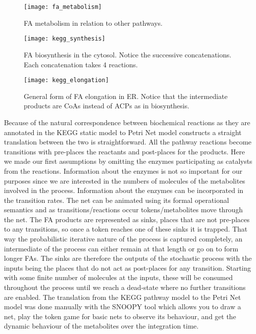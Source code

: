 \begin{figure}[htbp!]
\centering
\texttt{[image: fa\_metabolism]}
\caption[FA metabolism]{FA metabolism in relation to other pathways.}
\label{fig:fa_synthesis}
\end{figure}

\begin{figure}[htbp!]
\centering
\texttt{[image: kegg\_synthesis]}
\caption[Fatty Acid biosynthsis in cytosol]{FA biosynthesis in the
  cytosol. Notice the successive concatenations. Each concatenation
  takes 4 reactions.}
\label{fig:kegg_synthesis}
\end{figure}

\begin{figure}[htbp!]
\centering
\texttt{[image: kegg\_elongation]}
\caption[Fatty Acid elongation in ER]{General form of FA elongation in
ER. Notice that the intermediate products are CoAs instead of ACPs as
in biosynthesis.}
\label{fig:kegg_elongation}
\end{figure}

Because of the natural correspondence between biochemical reactions as
they are annotated in the KEGG static model to Petri Net model constructs
a straight translation between the two is straightforward. All the
pathway reactions become transitions with pre-places the reactants and
post-places for the products. Here we made our first assumptions by
omitting the enzymes participating as catalysts from the reactions. Information about the enzymes
is not so important for our purposes since we are interested in the
numbers of molecules of the metabolites involved in the process. Information
about the enzymes can be incorporated in the transition rates.
The net can be animated using its formal
operational semantics and as transitions/reactions occur
tokens/metabolites move through the net. The FA products are
represented as sinks, places that are not pre-places to any
transitions, so once a token reaches one of these sinks it is
trapped. That way the probabilistic iterative nature of the process is
captured completely, an intermediate of the process can either remain
at that length or go on to form longer FAs. The sinks are therefore
the outputs of the stochastic process with the inputs being the places
that do not act as post-places for any transition. Starting with some
finite number of molecules at the inputs, these will be consumed
throughout the process until we reach a dead-state where no further
transitions are enabled. The translation from the KEGG pathway model
to the Petri Net model was done manually with the SNOOPY \cite []
{heiner2012snoopy}tool which
allows you to draw a net, play the token game for basic nets to
observe its behaviour, and get the dynamic behaviour of the
metabolites over the integration time.

